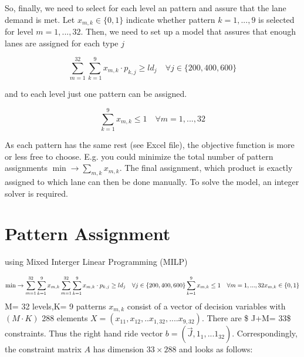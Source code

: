 \documentclass[
]{article}
\newenvironment{Shaded}{\begin{snugshade}}{\end{snugshade}}
\newcommand{\CommentTok}[1]{\textcolor[rgb]{0.56,0.35,0.01}{\textit{#1}}}
\newcommand{\DecValTok}[1]{\textcolor[rgb]{0.00,0.00,0.81}{#1}}
\newcommand{\KeywordTok}[1]{\textcolor[rgb]{0.13,0.29,0.53}{\textbf{#1}}}
\newcommand{\NormalTok}[1]{#1}
\newcommand{\OperatorTok}[1]{\textcolor[rgb]{0.81,0.36,0.00}{\textbf{#1}}}
\newcommand{\StringTok}[1]{\textcolor[rgb]{0.31,0.60,0.02}{#1}}
\begin{document}
\begin{Shaded}
\end{Shaded}

So, finally, we need to select for each level an pattern and assure that
the lane demand is met. Let \(x_{m,k} \in \{0,1\}\) indicate whether
pattern \(k=1,...,9\) is selected for level \(m= 1,...,32\). Then, we
need to set up a model that assures that enough lanes are assigned for
each type \(j\)

\[ \sum_{m = 1}^{32}\sum_{k = 1}^9 x_{m,k} \cdot p_{k,j} \geq ld_j \quad \forall j \in \{200,400,600\}\]

and to each level just one pattern can be assigned.

\[ \sum_{k = 1}^9 x_{m,k} \leq 1 \quad \forall m = 1,...,32\]

As each pattern has the same rest (see Excel file), the objective
function is more or less free to choose. E.g. you could minimize the
total number of pattern assignments
\(\min \rightarrow \sum_{m,k} x_{m,k}\). The final assignment, which
product is exactly assigned to which lane can then be done manually. To
solve the model, an integer solver is required.

\hypertarget{pattern-assignment}{%
\section{Pattern Assignment}\label{pattern-assignment}}

using Mixed Interger Linear Programming (MILP)

\[\min \rightarrow \sum_{m=1}^{32}\sum_{k=1}^{9} x_{m,k}  \\ \sum_{m = 1}^{32}\sum_{k = 1}^9 x_{m,k} \cdot p_{k,j} \geq ld_j \quad \forall j \in \{200,400,600\} \\  \sum_{k = 1}^9 x_{m,k} \leq 1 \quad \forall m = 1,...,32 \\ x_{m,k} \in \{0,1\}\]
M= 32 levels,K= 9 patterns \(x_{m,k}\) consist of a vector of decision
variables with \((M \cdot K)\) 288 elements
\(X= ( x_{11},x_{12},..x_{1,32},....x_{9,32} )\). There are \$ J+M= 33\$
constraints. Thus the right hand ride vector
\(b=(\vec J,1_1,...1_{32})\). Correspondingly, the constraint matrix
\(A\) has dimension \(33 \times 288\) and looks as follows:
\end{document}
